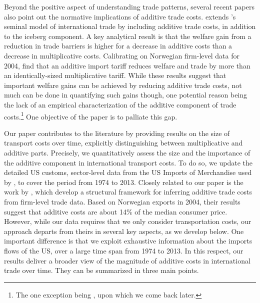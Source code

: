 \documentclass[a4paper,11pt]{article}
\begin{document}
Beyond the positive aspect of understanding trade patterns, several recent papers also point out the normative implications of additive trade costs. \citet{sorensen2014} extends \citet{melitz}'s seminal model of international trade by including additive trade costs, in addition to the iceberg component. A key analytical result is that the welfare gain from a reduction in trade barriers is higher for a decrease in additive costs than a decrease in multiplicative costs. Calibrating on Norwegian firm-level data for 2004, \citet{Irrazabal_2015} find that an additive import tariff reduces welfare and trade by more than an identically-sized multiplicative tariff. While these results suggest that important welfare gains can be achieved by reducing additive trade costs, not much can be done in quantifying such gains though, one potential reason being the lack of an empirical characterization of the additive component of trade costs.\footnote{The one exception being \citet{Irrazabal_2015}, upon which we come back later.} One objective of the paper is to palliate this gap. \bigskip


Our paper contributes to the literature by providing results on the size of transport costs over time, explicitly distinguishing between multiplicative and additive parts. Precisely, we quantitatively assess the size and the importance of the additive component in international transport costs. To do so, we update the detailed US customs, sector-level data from the US Imports of Merchandise used by \citet{hummels2007}, to cover the period from 1974 to 2013. Closely related to our paper is the work by \citet{Irrazabal_2015}, which develop a structural framework for inferring additive trade costs from firm-level trade data. Based on Norwegian exports in 2004, their results suggest that additive costs are about 14\% of the median consumer price. However, while our data requires that we only consider transportation costs, our approach departs from theirs in several key aspects, as we develop below. One important difference is that we exploit exhaustive information about the imports flows of the US, over a large time span from 1974 to 2013. In this respect, our results deliver a broader view of the magnitude of additive costs in international trade over time. They can be summarized in three main points.
\end{document}
